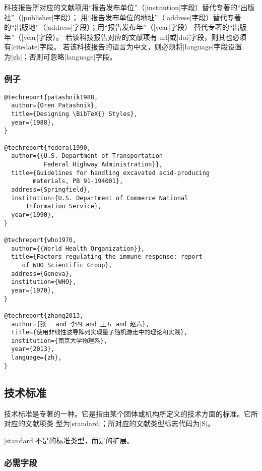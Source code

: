 \begin{note}
科技报告所对应的文献项用“报告发布单位”（|institution|字段）替代专著的“出版社”（|publisher|字段）；
用“报告发布单位的地址”（|address|字段）替代专著的“出版地”（|address|字段）；用“报告发布年”（|year|字段）
替代专著的“出版年”（|year|字段）。
若该科技报告对应的文献项有|url|或|doi|字段，则其也必须有|citedate|字段。
若该科技报告的语言为中文，则必须将|language|字段设置为|zh|；否则可忽略|language|字段。
\end{note}

\subsubsection{例子}

\begin{verbatim}
@techreport{patashnik1988,
  author={Oren Patashnik},
  title={Designing \BibTeX{} Styles},
  year={1988},
}

@techreport{federal1990,
  author={{U.S. Department of Transportation 
           Federal Highway Administration}},
  title={Guidelines for handling excavated acid-producing 
        materials, PB 91-194001},
  address={Springfield},
  institution={U.S. Department of Commerce National 
      Information Service},
  year={1990},
}

@techreport{who1970,
  author={{World Health Organization}},
  title={Factors regulating the immune response: report 
     of WHO Scientific Group},
  address={Geneva},
  institution={WHO},
  year={1970},
}

@techreport{zhang2013,
  author={张三 and 李四 and 王五 and 赵六},
  title={使用非线性波导阵列实现量子随机游走中的理论和实践},
  institution={南京大学物理系},
  year={2013},
  language={zh},
}
\end{verbatim}


\subsection{技术标准}\label{subsec:bibtype-standard}

技术标准是专著的一种。它是指由某个团体或机构所定义的技术方面的标准。它所对应的{\BibTeX}文献项类
型为|standard|；所对应的文献类型标志代码为|S|\cite{gbt3469-1983}。

|standard|不是{\BibTeX}的标准类型，而是{\njuthesis}的扩展。

\subsubsection{必需字段}

